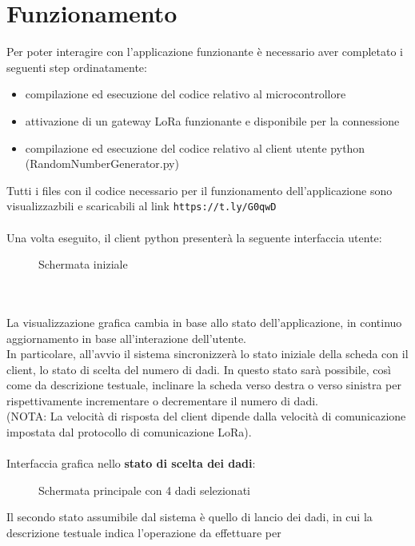 \section{Funzionamento}
Per poter interagire con l'applicazione funzionante è necessario aver completato i seguenti step ordinatamente:
\begin{itemize}
    \item compilazione ed esecuzione del codice relativo al microcontrollore
    \item attivazione di un gateway LoRa funzionante e disponibile per la connessione
    \item compilazione ed esecuzione del codice relativo al client utente python (RandomNumberGenerator.py)
\end{itemize}
Tutti i files con il codice necessario per il funzionamento dell'applicazione sono visualizzazbili e scaricabili al link \space\space \Verb|https://t.ly/G0qwD|
\\\\Una volta eseguito, il client python presenterà la seguente interfaccia utente:
\begin{figure}[h!]
    \centering
    \caption{Schermata iniziale}
    \label{fig:homepage}
\end{figure}
\\\\La visualizzazione grafica cambia in base allo stato dell'applicazione, in continuo aggiornamento in base all'interazione dell'utente.
\\In particolare, all'avvio il sistema sincronizzerà lo stato iniziale della scheda con il client, lo stato di scelta del numero di dadi.
In questo stato sarà possibile, così come da descrizione testuale, inclinare la scheda verso destra o verso sinistra per rispettivamente
incrementare o decrementare il numero di dadi. 
\\(NOTA: La velocità di risposta del client dipende dalla velocità di comunicazione 
impostata dal protocollo di comunicazione LoRa).
\\\\Interfaccia grafica nello \textbf{stato di scelta dei dadi}:
\begin{figure}[H]
    \centering
    \caption{Schermata principale con 4 dadi selezionati}
    \label{fig:RollStateOFF}
\end{figure}
Il secondo stato assumibile dal sistema è quello di lancio dei dadi, in cui la descrizione testuale indica l'operazione da effettuare per 
